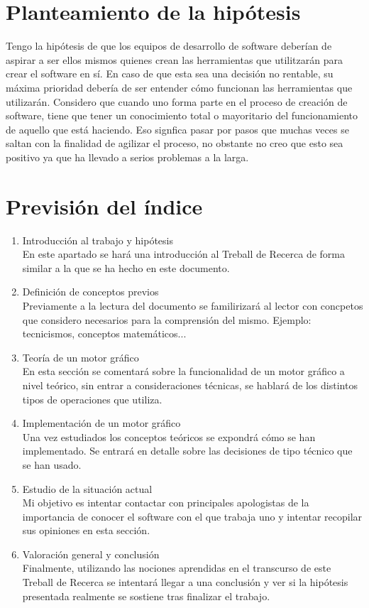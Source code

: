 \documentclass{article}
\begin{document}
\section{Planteamiento de la hipótesis}
Tengo la hipótesis de que los equipos de desarrollo de software deberían de aspirar a ser ellos mismos quienes crean las herramientas que utilitzarán para crear el software en sí. En caso de que esta sea una decisión no rentable, su máxima prioridad debería de ser entender cómo funcionan las herramientas que utilizarán. Considero que cuando uno forma parte en el proceso de creación de software, tiene que tener un conocimiento total o mayoritario del funcionamiento de aquello que está haciendo. Eso signfica pasar por pasos que muchas veces se saltan con la finalidad de agilizar el proceso, no obstante no creo que esto sea positivo ya que ha llevado a serios problemas a la larga.
\newpage
\section{Previsión del índice}
\begin{enumerate}
\item{Introducción al trabajo y hipótesis}\\
  En este apartado se hará una introducción al Treball de Recerca de forma similar a la que se ha hecho en este documento.
\item{Definición de conceptos previos}\\
  Previamente a la lectura del documento se familirizará al lector con concpetos que considero necesarios para la comprensión del mismo. Ejemplo: tecnicismos, conceptos matemáticos...
\item{Teoría de un motor gráfico}\\
  En esta sección se comentará sobre la funcionalidad de un motor gráfico a nivel teórico, sin entrar a consideraciones técnicas, se hablará de los distintos tipos de operaciones que utiliza.
\item{Implementación de un motor gráfico}\\
  Una vez estudiados los conceptos teóricos se expondrá cómo se han implementado. Se entrará en detalle sobre las decisiones de tipo técnico que se han usado.
\item{Estudio de la situación actual}\\
  Mi objetivo es intentar contactar con principales apologistas de la importancia de conocer el software con el que trabaja uno y intentar recopilar sus opiniones en esta sección.
\item{Valoración general y conclusión}\\
  Finalmente, utilizando las nociones aprendidas en el transcurso de este Treball de Recerca se intentará llegar a una conclusión y ver si la hipótesis presentada realmente se sostiene tras finalizar el trabajo.
\end{enumerate}
\end{document}

